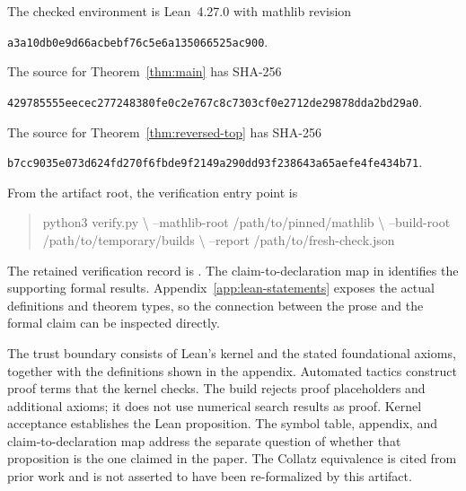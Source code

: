 \documentclass[11pt,a4paper]{article}
\newcommand{\code}[1]{\texttt{#1}}
\begin{document}
The checked environment is Lean~4.27.0 with mathlib revision
\begin{center}\small\code{a3a10db0e9d66acbebf76c5e6a135066525ac900}.\end{center}
The source for Theorem~\ref{thm:main} has SHA-256
\begin{center}\scriptsize\code{429785555eecec277248380fe0c2e767c8c7303cf0e2712de29878dda2bd29a0}.\end{center}
The source for Theorem~\ref{thm:reversed-top} has SHA-256
\begin{center}\scriptsize\code{b7cc9035e073d624fd270f6fbde9f2149a290dd93f238643a65aefe4fe434b71}.\end{center}
From the artifact root, the verification entry point is
\begin{quote}\small\ttfamily
python3 verify.py \textbackslash\newline
\hspace*{1em}--mathlib-root /path/to/pinned/mathlib \textbackslash\newline
\hspace*{1em}--build-root /path/to/temporary/builds \textbackslash\newline
\hspace*{1em}--report /path/to/fresh-check.json
\end{quote}
The retained verification record is
. The claim-to-declaration map in
 identifies the supporting formal results.
Appendix~\ref{app:lean-statements} exposes the actual definitions and
theorem types, so the connection between the prose and the formal claim
can be inspected directly.

The trust boundary consists of Lean's kernel and the stated foundational
axioms, together with the definitions shown in the appendix. Automated
tactics construct proof terms that the kernel checks. The build rejects
proof placeholders and additional axioms; it does not use numerical
search results as proof. Kernel acceptance establishes the Lean
proposition. The symbol table, appendix, and claim-to-declaration map address
the separate question of whether that proposition is the one claimed
in the paper. The Collatz equivalence is cited from prior work and is
not asserted to have been re-formalized by this artifact.
\end{document}

